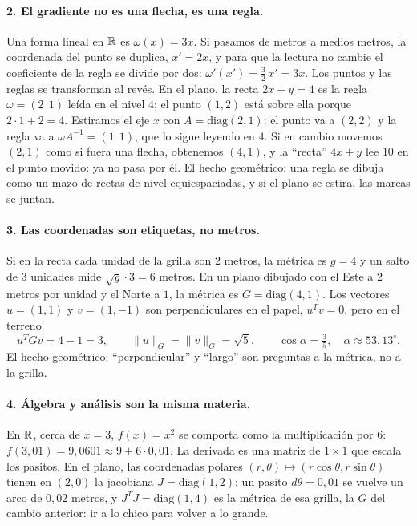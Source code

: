 \paragraph{2. El gradiente no es una flecha, es una regla.}
Una forma lineal en \(\mathbb{R}\) es \(\omega(x)=3x\). Si pasamos de metros a medios metros, la
coordenada del punto se duplica, \(x'=2x\), y para que la lectura no cambie el coeficiente
de la regla se divide por dos: \(\omega'(x')=\tfrac32\,x'=3x\). Los puntos y las reglas se
transforman al revés. En el plano, la recta \(2x+y=4\) es la regla \(\omega=(2\ \ 1)\)
leída en el nivel \(4\); el punto \((1,2)\) está sobre ella porque \(2\cdot1+2=4\).
Estiramos el eje \(x\) con \(A=\mathrm{diag}(2,1)\): el punto va a \((2,2)\) y la regla va a
\(\omega A^{-1}=(1\ \ 1)\), que lo sigue leyendo en \(4\). Si en cambio movemos \((2,1)\)
como si fuera una flecha, obtenemos \((4,1)\), y la \enquote{recta} \(4x+y\) lee \(10\) en el
punto movido: ya no pasa por él. El hecho geométrico: una regla se dibuja como un mazo de
rectas de nivel equiespaciadas, y si el plano se estira, las marcas se juntan.

\paragraph{3. Las coordenadas son etiquetas, no metros.}
Si en la recta cada unidad de la grilla son \(2\) metros, la métrica es \(g=4\) y un salto
de \(3\) unidades mide \(\sqrt{g}\cdot3=6\) metros. En un plano dibujado con el Este a
\(2\) metros por unidad y el Norte a \(1\), la métrica es \(G=\mathrm{diag}(4,1)\). Los
vectores \(u=(1,1)\) y \(v=(1,-1)\) son perpendiculares en el papel, \(u^Tv=0\), pero en el
terreno
\[
  u^TGv=4-1=3,\qquad \|u\|_G=\|v\|_G=\sqrt5,\qquad \cos\alpha=\tfrac35,\quad
  \alpha\approx53{,}13^\circ .
\]
El hecho geométrico: \enquote{perpendicular} y \enquote{largo} son preguntas a la métrica, no a la
grilla.

\paragraph{4. Álgebra y análisis son la misma materia.}
En \(\mathbb{R}\), cerca de \(x=3\), \(f(x)=x^2\) se comporta como la multiplicación por \(6\):
\(f(3{,}01)=9{,}0601\approx9+6\cdot0{,}01\). La derivada es una matriz de \(1\times1\) que
escala los pasitos. En el plano, las coordenadas polares \((r,\theta)\mapsto(r\cos\theta,
r\sin\theta)\) tienen en \((2,0)\) la jacobiana \(J=\mathrm{diag}(1,2)\): un pasito
\(d\theta=0{,}01\) se vuelve un arco de \(0{,}02\) metros, y \(J^TJ=\mathrm{diag}(1,4)\) es
la métrica de esa grilla, la \(G\) del cambio anterior: ir a lo chico para volver a lo grande.

